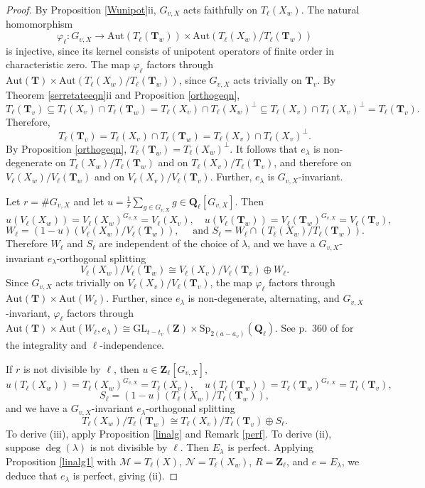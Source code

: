 \documentclass{amsart}
\def\Q{{\mathbf Q}}
\def\Z{{\mathbf Z}}
\def\Aut{\mathrm{Aut}}
\def\I{{\mathcal I}}
\def\GL{\mathrm{GL}}
\def\Sp{\mathrm{Sp}}
\def\M{\mathcal{M}}
\def\N{\mathcal{N}}
\def\T{{\mathbf T}}
\theoremstyle{definition}
\begin{document}
\begin{proof}
By Proposition \ref{Wunipot}ii, $G_{v,X}$ acts faithfully on 
$T_{\ell}(X_{w})$.
The natural homomorphism
$$\varphi_{\ell} : G_{v,X} \to 
\Aut(T_{\ell}(\T_{w})) \times \Aut(T_{\ell}(X_{w})/T_{\ell}(\T_{w}))$$
is injective, since its kernel 
consists of unipotent operators of finite order
in characteristic zero.
The map $\varphi_{\ell}$ factors through 
$\Aut(\T) \times \Aut(T_{\ell}(X_{w})/T_{\ell}(\T_{w}))$,
since $G_{v,X}$ acts trivially on $\T_{v}$.
By Theorem \ref{serretateeqn}ii and Proposition \ref{orthogeqn}, 
$$T_{\ell}(\T_{v}) \subseteq 
T_{\ell}(X_{v}) \cap T_{\ell}(\T_{w}) =
T_{\ell}(X_{v}) \cap T_{\ell}(X_{w})^{\perp}
\subseteq 
T_{\ell}(X_{v}) \cap T_{\ell}(X_{v})^{\perp} =
T_{\ell}(\T_{v}).$$
Therefore,
$$T_{\ell}(\T_{v}) =
T_{\ell}(X_{v}) \cap T_{\ell}(\T_{w}) =
T_{\ell}(X_{v}) \cap T_{\ell}(X_{v})^{\perp}.$$
By Proposition \ref{orthogeqn}, 
$T_{\ell}(\T_{w}) = T_{\ell}(X_{w})^{\perp}$.
It follows that $e_\lambda$ 
is non-degenerate
on $T_\ell(X_w)/T_\ell(\T_w)$ and on
$T_\ell(X_v)/T_\ell(\T_v)$, and therefore on
$V_\ell(X_w)/V_\ell(\T_w)$ and on
$V_\ell(X_v)/V_\ell(\T_v)$. Further, $e_\lambda$ is
$G_{v,X}$-invariant.

Let $r = \#G_{v,X}$ and let
$u = \frac{1}{r}\sum_{g\in G_{v,X}}g \in \Q_\ell[G_{v,X}]$.
Then 
$$u(V_\ell(X_w)) = V_\ell(X_w)^{G_{v,X}} = V_\ell(X_v), \quad
u(V_\ell(\T_w)) = V_\ell(\T_w)^{G_{v,X}} = V_\ell(\T_v),$$
$$W_{\ell} = (1-u)(V_\ell(X_w)/V_\ell(\T_w)), \quad \text{ and }
S_{\ell}=W_{\ell} \cap (T_\ell(X_w)/T_\ell(\T_w)).$$
Therefore $W_{\ell}$ and $S_{\ell}$ are
independent of the choice of $\lambda$, and we have
a $G_{v,X}$-invariant $e_\lambda$-orthogonal splitting
$$V_{\ell}(X_{w})/V_{\ell}(\T_{w}) \cong 
V_{\ell}(X_{v})/V_{\ell}(\T_{v}) \oplus W_{\ell}.$$
Since $G_{v,X}$ acts trivially on $V_{\ell}(X_{v})/V_{\ell}(\T_{v})$, 
the map
$\varphi_{\ell}$ factors through 
$\Aut(\T) \times \Aut(W_{\ell})$.
Further, since $e_{\lambda}$ is non-degenerate, alternating, and
$G_{v,X}$-invariant, $\varphi_{\ell}$ factors through 
$\Aut(\T) \times \Aut(W_{\ell},e_{\lambda})
\cong \GL_{t-t_{v}}(\Z) \times \Sp_{2(a-a_{v})}(\Q_{\ell})$.
See p.~360 of \cite{SGA} for the integrality and
$\ell$-independence.

If $r$ is not divisible by $\ell$, then $u \in 
\Z_\ell[G_{v,X}]$, 
$$u(T_\ell(X_w)) = T_\ell(X_w)^{G_{v,X}} = T_\ell(X_v), \quad
u(T_\ell(\T_w)) = T_\ell(\T_w)^{G_{v,X}} = T_\ell(\T_v),$$
$$S_{\ell} = (1-u)(T_\ell(X_w)/T_\ell(\T_w)),$$  and we have
 a $G_{v,X}$-invariant $e_\lambda$-orthogonal splitting
$$T_{\ell}(X_{w})/T_{\ell}(\T_{w}) \cong 
T_{\ell}(X_{v})/T_{\ell}(\T_{v}) \oplus S_{\ell}.$$
To derive (iii), 
apply Proposition \ref{linalg}
and Remark \ref{perf}.
To derive (ii), 
suppose $\deg(\lambda)$ is not divisible by $\ell$. 
Then $E_{\lambda}$ is perfect.
Applying Proposition \ref{linalg1} with
$\M = T_\ell(X)$, $\N = T_\ell(X_w)$, $R = \Z_\ell$,
and $e = E_\lambda$, we deduce that $e_{\lambda}$ is
perfect, giving (ii).
\end{proof}
\end{document}
